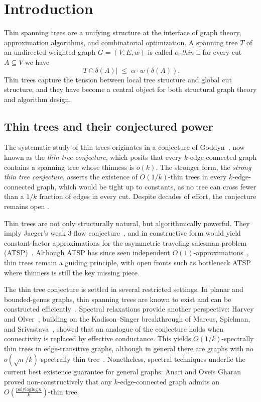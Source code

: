 \documentclass[11pt,letterpaper]{article}
\begin{document}
	\newpage


\section{Introduction}

Thin spanning trees are a unifying structure at the interface of graph theory,
approximation algorithms, and combinatorial optimization. A spanning tree $T$ of
an undirected weighted graph $G=(V,E,w)$ is called $\alpha$-\emph{thin} if for
every cut $A\subseteq V$ we have
\[
\lvert T\cap \delta(A)\rvert \;\le\; \alpha \cdot w(\delta(A)).
\]
Thin trees capture the tension between local tree structure and global cut
structure, and they have become a central object for both structural graph
theory and algorithm design.

\subsection{Thin trees and their conjectured power}
The systematic study of thin trees originates in a conjecture of
Goddyn~\cite{God04}, now known as the \emph{thin tree conjecture}, which posits
that every $k$-edge-connected graph contains a spanning tree whose thinness is
$o(k)$. The stronger form, the \emph{strong thin tree conjecture}, asserts the
existence of $O(1/k)$-thin trees in every $k$-edge-connected graph, which would be
tight up to constants, as no tree can cross fewer than a $1/k$ fraction of edges
in every cut. Despite decades of effort, the conjecture remains open
\cite{God04,OS11,anariog2015focs}.

Thin trees are not only structurally natural, but algorithmically powerful. They
imply Jaeger’s weak 3-flow conjecture~\cite{Jae84}, and in constructive form
would yield constant-factor approximations for the asymmetric traveling salesman
problem (ATSP)~\cite{asadpour2017}. Although ATSP has since seen independent
$O(1)$-approximations~\cite{STV18,TraubVygen2024}, thin trees remain a guiding
principle, with open fronts such as bottleneck ATSP~\cite{AKS21} where thinness
is still the key missing piece.

The thin tree conjecture is settled in several restricted settings. In planar
and bounded-genus graphs, thin spanning trees are known to exist and can be
constructed efficiently~\cite{OS11}. Spectral relaxations provide another
perspective: Harvey and Olver~\cite{HO14}, building on the
Kadison--Singer breakthrough of Marcus, Spielman, and Srivastava~\cite{MSS13},
showed that an analogue of the conjecture holds when connectivity is replaced
by effective conductance. This yields $O(1/k)$-spectrally thin trees in
edge-transitive graphs, although in general there are graphs with no
$o(\sqrt{n}/k)$-spectrally thin tree~\cite{HO14,Goe12}. Nonetheless, spectral
techniques underlie the current best existence guarantee for general graphs:
Anari and Oveis Gharan~\cite{anariog2015focs} proved non-constructively that any
$k$-edge-connected graph admits an $O(\frac{\text{polyloglog}\, n}{k})$-thin tree.
\end{document}
